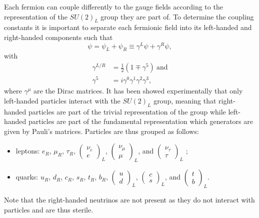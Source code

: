     Each fermion can couple differently to the gauge fields according to the representation of the $ SU(2)_L $ group they are part of. To determine the coupling constants it is important to separate each fermionic field into its left-handed and right-handed components such that
    \begin{equation}
      \psi = \psi_L + \psi_R \equiv \gamma^L \psi + \gamma^R \psi ,
    \end{equation}
    with
    \begin{align}
      \gamma^{L/R} & = \frac{1}{2} \left( 1 \mp \gamma^5 \right) \ \text{and} \\
      \gamma^5 & = i \gamma^0 \gamma^1 \gamma^2 \gamma^3 ,
    \end{align}
    where $ \gamma^\mu $ are the Dirac matrices. It has been showed experimentally that only left-handed particles interact with the $ SU(2)_L $ group, meaning that right-handed particles are part of the trivial representation of the group while left-handed particles are part of the fundamental representation which generators are given by Pauli's matrices. Particles are thus grouped as follows:
    \begin{itemize}
      \item leptons: $ e_R $, $ \mu_R $, $ \tau_R $, $ \left( \begin{matrix} \nu_e \\ e \end{matrix} \right)_L $, $ \left( \begin{matrix} \nu_\mu \\ \mu \end{matrix} \right)_L $, and $ \left( \begin{matrix} \nu_\tau \\ \tau \end{matrix} \right)_L $ ;
      \item quarks: $ u_R $, $ d_R $, $ c_R $, $ s_R $, $ t_R $, $ b_R $, $ \left( \begin{matrix} u \\ d \end{matrix} \right)_L $, $ \left( \begin{matrix} c \\ s \end{matrix} \right)_L $, and $ \left( \begin{matrix} t \\ b \end{matrix} \right)_L $.
    \end{itemize}
    Note that the right-handed neutrinos are not present as they do not interact with particles and are thus sterile. \\

